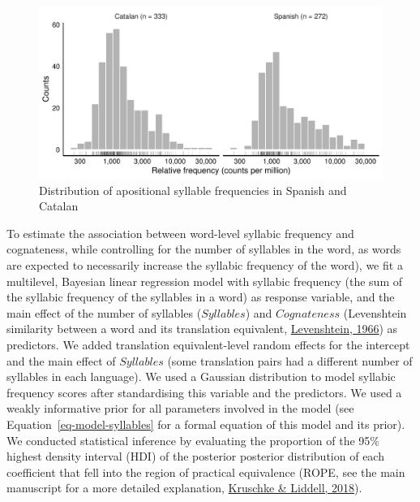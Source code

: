 \documentclass[
]{article}
\begin{document}
\begin{figure}

{\centering \includegraphics{appendix_files/figure-pdf/fig-syll-freq-1.pdf}

}

\caption{\label{fig-syll-freq}Distribution of apositional syllable
frequencies in Spanish and Catalan}

\end{figure}

To estimate the association between word-level syllabic frequency and
cognateness, while controlling for the number of syllables in the word,
as words are expected to necessarily increase the syllabic frequency of
the word), we fit a multilevel, Bayesian linear regression model with
syllabic frequency (the sum of the syllabic frequency of the syllables
in a word) as response variable, and the main effect of the number of
syllables (\(Syllables\)) and \(Cognateness\) (Levenshtein similarity
between a word and its translation equivalent,
\protect\hyperlink{ref-levenshtein1966binary}{Levenshtein, 1966}) as
predictors. We added translation equivalent-level random effects for the
intercept and the main effect of \(Syllables\) (some translation pairs
had a different number of syllables in each language). We used a
Gaussian distribution to model syllabic frequency scores after
standardising this variable and the predictors. We used a weakly
informative prior for all parameters involved in the model (see
Equation~\ref{eq-model-syllables} for a formal equation of this model
and its prior). We conducted statistical inference by evaluating the
proportion of the 95\% highest density interval (HDI) of the posterior
posterior distribution of each coefficient that fell into the region of
practical equivalence (ROPE, see the main manuscript for a more detailed
explanation, \protect\hyperlink{ref-kruschke2018bayesian}{Kruschke \&
Liddell, 2018}).
\end{document}
